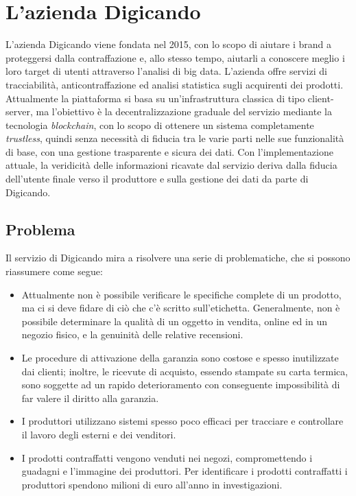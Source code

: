 \chapter{L'azienda Digicando}
\label{lazienda-digicando}
L'azienda Digicando viene fondata nel 2015, con lo scopo di aiutare i brand a proteggersi dalla contraffazione e, allo stesso tempo, aiutarli a conoscere meglio i loro target di utenti attraverso l'analisi di big data. L'azienda offre servizi di tracciabilità, anticontraffazione ed analisi statistica sugli acquirenti dei prodotti. Attualmente la piattaforma si basa su un'infrastruttura classica di tipo client-server, ma l'obiettivo è la decentralizzazione graduale del servizio mediante la tecnologia \emph{blockchain}, con lo scopo di ottenere un sistema completamente \emph{trustless}, quindi senza necessità di fiducia tra le varie parti nelle sue funzionalità di base, con una gestione trasparente e sicura dei dati. Con l'implementazione attuale, la veridicità delle informazioni ricavate dal servizio deriva dalla fiducia dell'utente finale verso il produttore e sulla gestione dei dati da parte di Digicando.

\section{Problema}
\label{problema}
Il servizio di Digicando mira a risolvere una serie di problematiche, che si possono riassumere come segue:
\begin{itemize}
    \item Attualmente non è possibile verificare le specifiche complete di un prodotto, ma ci si deve fidare di ciò che c'è scritto sull'etichetta. Generalmente, non è possibile determinare la qualità di un oggetto in vendita, online ed in un negozio fisico, e la genuinità delle relative recensioni.
    \item Le procedure di attivazione della garanzia sono costose e spesso inutilizzate dai clienti; inoltre, le ricevute di acquisto, essendo stampate su carta termica, sono soggette ad un rapido deterioramento con conseguente impossibilità di far valere il diritto alla garanzia.
    \item I produttori utilizzano sistemi spesso poco efficaci per tracciare e controllare il lavoro degli esterni e dei venditori.
    \item I prodotti contraffatti vengono venduti nei negozi, compromettendo i guadagni e l'immagine dei produttori. Per identificare i prodotti contraffatti i produttori spendono milioni di euro all'anno in investigazioni.
\end{itemize}

